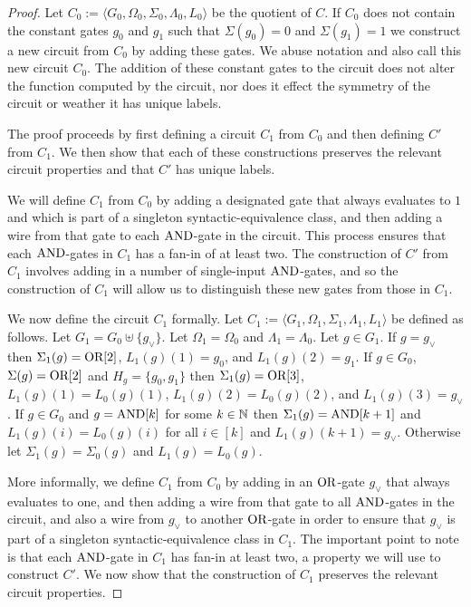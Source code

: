 \documentclass[../paper.tex]{subfiles}
\begin{document}
\begin{proof}
  Let $C_0 := \langle G_0, \Omega_0, \Sigma_0, \Lambda_0, L_0 \rangle$ be the
  quotient of $C$. If $C_0$ does not contain the constant gates $g_0$ and $g_1$
  such that $\Sigma(g_0) = 0$ and $\Sigma (g_1) = 1$ we construct a new circuit
  from $C_0$ by adding these gates. We abuse notation and also call this new
  circuit $C_0$. The addition of these constant gates to the circuit does not
  alter the function computed by the circuit, nor does it effect the symmetry of
  the circuit or weather it has unique labels.

  The proof proceeds by first defining a circuit $C_1$ from $C_0$ and then
  defining $C'$ from $C_1$. We then show that each of these constructions
  preserves the relevant circuit properties and that $C'$ has unique labels.

  We will define $C_1$ from $C_0$ by adding a designated gate that always
  evaluates to $1$ and which is part of a singleton syntactic-equivalence class,
  and then adding a wire from that gate to each $\text{\upshape AND}$-gate in the circuit. This
  process ensures that each $\text{\upshape AND}$-gates in $C_1$ has a fan-in of at least two.
  The construction of $C'$ from $C_1$ involves adding in a number of
  single-input $\text{\upshape AND}$-gates, and so the construction of $C_1$ will allow us to
  distinguish these new gates from those in $C_1$.

  We now define the circuit $C_1$ formally. Let $C_1 := \langle G_1, \Omega_1,
  \Sigma_1 , \Lambda_1, L_1 \rangle$ be defined as follows. Let $G_1 = G_0
  \uplus \{ g_\lor\}$. Let $\Omega_1 = \Omega_0$ and $\Lambda_1 = \Lambda_0$.
  Let $g \in G_1$. If $g = g_\lor$ then $\Sigma_1 (g) = \text{\upshape OR}[2]$, $L_1(g)(1) =
  g_0$, and $L_1(g)(2) = g_1$. If $g \in G_0$, $\Sigma(g) = \text{\upshape OR}[2]$ and $H_g =
  \{g_0, g_1\}$ then $\Sigma_1 (g) = \text{\upshape OR}[3]$, $L_1(g)(1) = L_0(g)(1)$,
  $L_1(g)(2) = L_0(g)(2)$, and $L_1(g)(3) = g_\lor$. If $g \in G_0$ and $g =
  \text{\upshape AND}[k]$ for some $k \in \mathbb{N}$ then $\Sigma_1(g) = \text{\upshape AND}[k+1]$ and $L_1(g)(i)
  = L_0(g)(i)$ for all $i \in [k]$ and $L_1(g)(k+1) = g_\lor$. Otherwise let
  $\Sigma_1(g) = \Sigma_0(g)$ and $L_1(g) = L_0(g)$.

  More informally, we define $C_1$ from $C_0$ by adding in an $\text{\upshape OR}$-gate
  $g_\lor$ that always evaluates to one, and then adding a wire from that gate
  to all $\text{\upshape AND}$-gates in the circuit, and also a wire from $g_\lor$ to another
  $\text{\upshape OR}$-gate in order to ensure that $g_\lor$ is part of a singleton
  syntactic-equivalence class in $C_1$. The important point to note is that each
  $\text{\upshape AND}$-gate in $C_1$ has fan-in at least two, a property we will use to
  construct $C'$. We now show that the construction of $C_1$ preserves the
  relevant circuit properties.
  

\end{proof}
\end{document}
